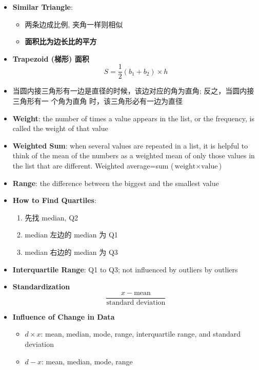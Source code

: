 \begin{multicols}{2}
\begin{itemize}
    \item \textbf{Similar Triangle}:
    \begin{itemize}
      \item 两条边成比例, 夹角一样则相似
      \item \textbf{面积比为边长比的平方}
    \end{itemize}

    \item \textbf{Trapezoid (梯形) 面积}
    \begin{equation}
      S = \frac{1}{2}\left( b_{1} + b_{2} \right) \times h
    \end{equation}

    \item 当圆内接三角形有一边是直径的时候，该边对应的角为直角; 反之，当圆内接三角形有一
    个角为直角 时，该三角形必有一边为直径

    \item \textbf{Weight}: the number of times a value appears in the list,
    or the frequency, is called the weight of that value

    \item \textbf{Weighted Sum}: when several values are repeated in a list,
    it is helpful to think of the mean of the numbers as a weighted mean of
    only those values in the list that are different. Weighted average=sum
    ($ \text{weight} \times \text{value} $)

    \item \textbf{Range}: the difference between the biggest and the smallest
    value

    \item \textbf{How to Find Quartiles}:
    \begin{enumerate}
      \item 先找 median, Q2
      \item median 左边的 median 为 Q1
      \item median 右边的 median 为 Q3
    \end{enumerate}

    \item \textbf{Interquartile Range}: Q1 to Q3; not influenced by outliers
    by outliers

    \item \textbf{Standardization}
    \begin{equation}
      \frac{x - \text{mean}}{\text{standard deviation}}
    \end{equation}

    \item \textbf{Influence of Change in Data}
    \begin{itemize}
      \item $ d \times x $: mean, median, mode, range, interquartile range,
      and standard deviation
      \item $ d - x $: mean, median, mode, range
    \end{itemize}


\end{itemize}
\end{multicols}
